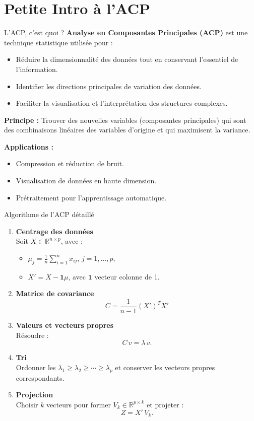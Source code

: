 \documentclass{beamer}
\begin{document}
\section{Petite Intro à l'ACP}
\begin{frame}{L'ACP, c'est quoi ?}
    \textbf{Analyse en Composantes Principales (ACP)} est une technique statistique utilisée pour :
    \begin{itemize}
        \item Réduire la dimensionnalité des données tout en conservant l'essentiel de l'information.
        \item Identifier les directions principales de variation des données.
        \item Faciliter la visualisation et l'interprétation des structures complexes.
    \end{itemize}
    
    \textbf{Principe :} Trouver des nouvelles variables (composantes principales) qui sont des combinaisons linéaires des variables d'origine et qui maximisent la variance.
    
    \textbf{Applications :}
    \begin{itemize}
        \item Compression et réduction de bruit.
        \item Visualisation de données en haute dimension.
        \item Prétraitement pour l'apprentissage automatique.
    \end{itemize}
\end{frame}

\begin{frame}{Algorithme de l'ACP détaillé}
\footnotesize
\begin{enumerate}
    \item \textbf{Centrage des données} \\
    Soit $X\in\mathbb{R}^{n\times p}$, avec :
    \begin{itemize}
        \item $\mu_j=\frac{1}{n}\sum_{i=1}^{n}x_{ij}$, $j=1,\dots,p$,
        \item $X'=X-\mathbf{1}\mu$, avec $\mathbf{1}$ vecteur colonne de 1.
    \end{itemize}
    \item \textbf{Matrice de covariance} \\
    \[
    C=\frac{1}{n-1}(X')^T X'
    \]
    \item \textbf{Valeurs et vecteurs propres} \\
    Résoudre :
    \[
    C\,v=\lambda\,v.
    \]
    \item \textbf{Tri} \\
    Ordonner les $\lambda_1\ge\lambda_2\ge\cdots\ge\lambda_p$ et conserver les vecteurs propres correspondants.
    \item \textbf{Projection} \\
    Choisir $k$ vecteurs pour former $V_k\in\mathbb{R}^{p\times k}$ et projeter :
    \[
    Z=X'\,V_k.
    \]
\end{enumerate}
\end{frame}
\end{document}
